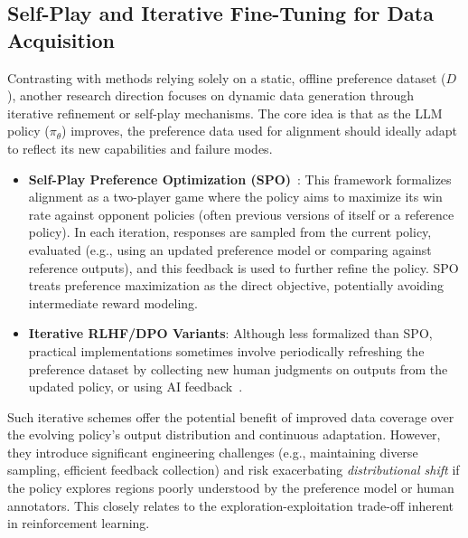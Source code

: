 \documentclass[a4paper,oneside,10pt,ngerman,english]{scrartcl}
\begin{document}
\subsection{Self-Play and Iterative Fine-Tuning for Data Acquisition}
Contrasting with methods relying solely on a static, offline preference dataset (\(D\)), another research direction focuses on dynamic data generation through iterative refinement or self-play mechanisms. The core idea is that as the LLM policy (\(\pi_\theta\)) improves, the preference data used for alignment should ideally adapt to reflect its new capabilities and failure modes.
\begin{itemize}
    \item \textbf{Self-Play Preference Optimization (SPO)}~\cite{bib:swamy2024spo}: This framework formalizes alignment as a two-player game where the policy aims to maximize its win rate against opponent policies (often previous versions of itself or a reference policy). In each iteration, responses are sampled from the current policy, evaluated (e.g., using an updated preference model or comparing against reference outputs), and this feedback is used to further refine the policy. SPO treats preference maximization as the direct objective, potentially avoiding intermediate reward modeling.
    \item \textbf{Iterative RLHF/DPO Variants}: Although less formalized than SPO, practical implementations sometimes involve periodically refreshing the preference dataset by collecting new human judgments on outputs from the updated policy, or using AI feedback~\cite{lee2023rlaif}.
\end{itemize}
Such iterative schemes offer the potential benefit of improved data coverage over the evolving policy's output distribution and continuous adaptation. However, they introduce significant engineering challenges (e.g., maintaining diverse sampling, efficient feedback collection) and risk exacerbating \emph{distributional shift} if the policy explores regions poorly understood by the preference model or human annotators. This closely relates to the exploration-exploitation trade-off inherent in reinforcement learning.
\end{document}
